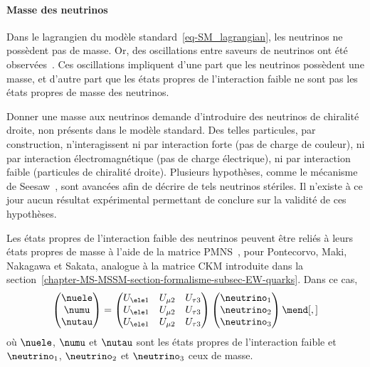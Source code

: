 \paragraph{Masse des neutrinos}
Dans le lagrangien du modèle standard~\eqref{eq-SM_lagrangian}, les neutrinos ne possèdent pas de masse.
Or, des oscillations entre saveurs de neutrinos ont été observées~\cite{neutrino_oscillations_1,neutrino_oscillations_2}.
Ces oscillations impliquent d'une part que les neutrinos possèdent une masse, et d'autre part que les états propres de l'interaction faible ne sont pas les états propres de masse des neutrinos.
\par Donner une masse aux neutrinos demande d'introduire des neutrinos de chiralité droite, non présents dans le modèle standard.
Des telles particules, par construction, n'interagissent ni par interaction forte (pas de charge de couleur), ni par interaction électromagnétique (pas de charge électrique), ni par interaction faible (particules de chiralité droite).
Plusieurs hypothèses, comme le mécanisme de Seesaw~\cite{neutrino_masses_1,neutrino_masses_2,neutrino_masses_3,neutrino_masses_4,neutrino_masses_5}, sont avancées afin de décrire de tels neutrinos stériles.
Il n'existe à ce jour aucun résultat expérimental permettant de conclure sur la validité de ces hypothèses.
\par Les états propres de l'interaction faible des neutrinos peuvent être reliés à leurs états propres de masse à l'aide de la matrice PMNS~\cite{PMNS_MNS}, pour Pontecorvo, Maki, Nakagawa et Sakata, analogue à la matrice CKM introduite dans la section~\ref{chapter-MS-MSSM-section-formalisme-subsec-EW-quarks}.
Dans ce cas,
\begin{equation}
\begin{pmatrix}
\nuele \\ \numu \\ \nutau
\end{pmatrix}
=
\begin{pmatrix}
U_{\ele 1} & U_{\mu 2} & U_{\tau 3} \\
U_{\ele 1} & U_{\mu 2} & U_{\tau 3} \\
U_{\ele 1} & U_{\mu 2} & U_{\tau 3} \\
\end{pmatrix}
\begin{pmatrix}
\neutrino_1 \\ \neutrino_2 \\ \neutrino_3
\end{pmatrix}
\mend[,]
\end{equation}
où $\nuele$, $\numu$ et $\nutau$ sont les états propres de l'interaction faible et $\neutrino_1$, $\neutrino_2$ et $\neutrino_3$ ceux de masse.
